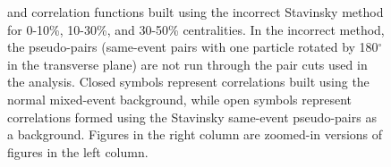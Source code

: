 \documentclass[../AnalysisNoteJBuxton.tex]{subfiles}
\begin{document}
\begin{figure}[h!]
  \caption[\LamK Stavinsky Correlation Functions (Incorrect)]{\LamK and \ALamAK correlation functions built using the incorrect Stavinsky method for 0-10\%, 10-30\%, and 30-50\% centralities.  In the incorrect method, the pseudo-pairs (same-event pairs with one particle rotated by 180$^\circ$ in the transverse plane) are not run through the pair cuts used in the analysis.  Closed symbols represent correlations built using the normal mixed-event background, while open symbols represent correlations formed using the Stavinsky same-event pseudo-pairs as a background.  Figures in the right column are zoomed-in versions of figures in the left column.}
  \label{fig:AllStavCfs_Incorrect}
\end{figure}




\begin{figure}[h!]
  \centering
  \\    
  

\end{figure}
\end{document}
